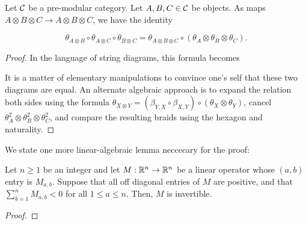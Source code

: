 \begin{lem} Let ${\mathcal C}$ be a pre-modular category. Let $A,B,C\in {\mathcal C}$ be objects. As maps $A\otimes B\otimes C \to A\otimes B \otimes C$, we have the identity

$$\theta_{A\otimes B}\circ \theta_{A\otimes C}\circ \theta_{B\otimes C} = \theta_{A\otimes B\otimes C}\circ (\theta_{A}\otimes \theta_{B}\otimes \theta_{C}).$$
\end{lem}
\begin{proof} In the language of string diagrams, this formula becomes


It is a matter of elementary manipulations to convince one's self that these two diagrams are equal. An alternate algebraic approach is to expand the relation both sides using the formula $\theta_{X\otimes Y}=(\beta_{Y,X}\circ \beta_{X,Y})\circ (\theta_{X}\otimes \theta_{Y})$, cancel $\theta_{A}^2\otimes \theta_{B}^2\otimes \theta_{C}^2$, and compare the resulting braids using the hexagon and naturality.
\end{proof}

We state one more linear-algebraic lemma neccecary for the proof:

\begin{lem} Let $n\geq 1$ be an integer and let $M:{\mathbb R}^n\to {\mathbb R}^n$ be a linear operator whose $(a,b)$ entry is $M_{a,b}$. Suppose that all off diagonal entries of $M$ are positive, and that $\sum_{b=1}^n M_{a,b}<0$ for all $1\leq a\leq n$. Then, $M$ is invertible.
\end{lem}
\begin{proof}
\end{proof}

